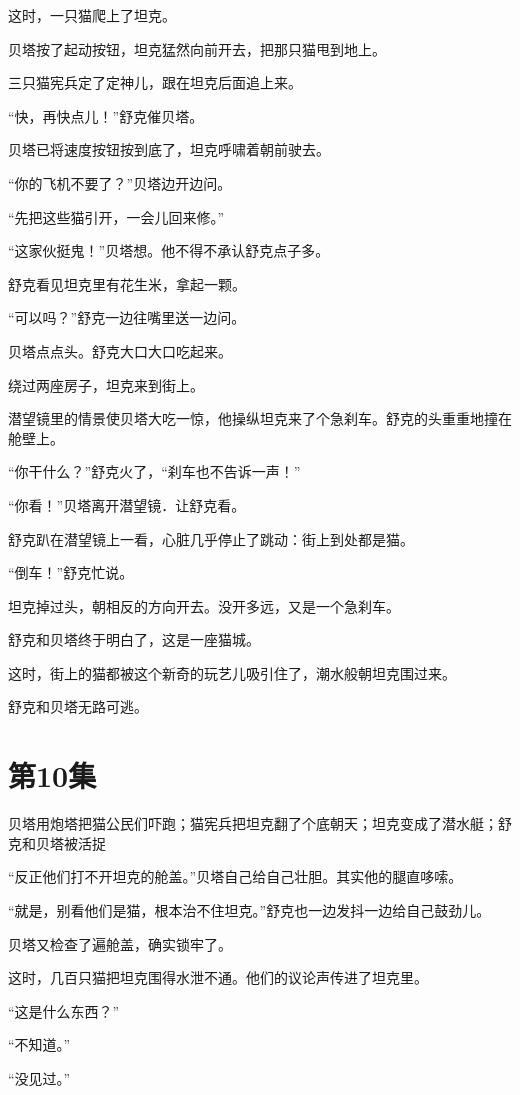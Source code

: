 \documentclass[a4paper,12pt,UTF8,twoside]{ctexbook}
\begin{document}
这时，一只猫爬上了坦克。

贝塔按了起动按钮，坦克猛然向前开去，把那只猫甩到地上。

三只猫宪兵定了定神儿，跟在坦克后面追上来。

“快，再快点儿！”舒克催贝塔。

贝塔已将速度按钮按到底了，坦克呼啸着朝前驶去。

“你的飞机不要了？”贝塔边开边问。

“先把这些猫引开，一会儿回来修。”

“这家伙挺鬼！”贝塔想。他不得不承认舒克点子多。

舒克看见坦克里有花生米，拿起一颗。

“可以吗？”舒克一边往嘴里送一边问。

贝塔点点头。舒克大口大口吃起来。

绕过两座房子，坦克来到街上。

潜望镜里的情景使贝塔大吃一惊，他操纵坦克来了个急刹车。舒克的头重重地撞在舱壁上。

“你干什么？”舒克火了，“刹车也不告诉一声！”

“你看！”贝塔离开潜望镜．让舒克看。

舒克趴在潜望镜上一看，心脏几乎停止了跳动：街上到处都是猫。

“倒车！”舒克忙说。

坦克掉过头，朝相反的方向开去。没开多远，又是一个急刹车。

舒克和贝塔终于明白了，这是一座猫城。

这时，街上的猫都被这个新奇的玩艺儿吸引住了，潮水般朝坦克围过来。

舒克和贝塔无路可逃。

\chapter{第10集}

贝塔用炮塔把猫公民们吓跑；猫宪兵把坦克翻了个底朝天；坦克变成了潜水艇；舒克和贝塔被活捉

“反正他们打不开坦克的舱盖。”贝塔自己给自己壮胆。其实他的腿直哆嗦。

“就是，别看他们是猫，根本治不住坦克。”舒克也一边发抖一边给自己鼓劲儿。

贝塔又检查了遍舱盖，确实锁牢了。

这时，几百只猫把坦克围得水泄不通。他们的议论声传进了坦克里。

“这是什么东西？”

“不知道。”

“没见过。”
\end{document}
